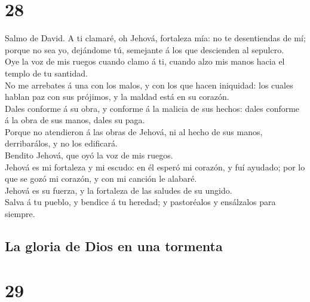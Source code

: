 \hypertarget{section-19-28}{%
\section{28}\label{section-19-28}}

 Salmo de David. A ti clamaré, oh Jehová, fortaleza mía:
no te desentiendas de mí; porque no sea yo, dejándome tú, semejante á
los que descienden al sepulcro.\\
 Oye la voz de mis ruegos cuando clamo á ti, cuando alzo
mis manos hacia el templo de tu santidad.\\
 No me arrebates á una con los malos, y con los que hacen
iniquidad: los cuales hablan paz con sus prójimos, y la maldad está en
su corazón.\\
 Dales conforme á su obra, y conforme á la malicia de sus
hechos: dales conforme á la obra de sus manos, dales su paga.\\
 Porque no atendieron á las obras de Jehová, ni al hecho
de sus manos, derribarálos, y no los edificará.\\
 Bendito Jehová, que oyó la voz de mis ruegos.\\
 Jehová es mi fortaleza y mi escudo: en él esperó mi
corazón, y fuí ayudado; por lo que se gozó mi corazón, y con mi canción
le alabaré.\\
 Jehová es su fuerza, y la fortaleza de las saludes de su
ungido.\\
 Salva á tu pueblo, y bendice á tu heredad; y pastoréalos
y ensálzalos para siempre.

\hypertarget{la-gloria-de-dios-en-una-tormenta}{%
\subsection{La gloria de Dios en una
tormenta}\label{la-gloria-de-dios-en-una-tormenta}}

\hypertarget{section-19-29}{%
\section{29}\label{section-19-29}}

